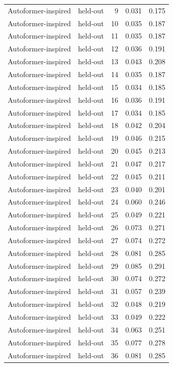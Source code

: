 \begin{tabular}{llrrr}
Autoformer-inspired & held-out & 9 & 0.031 & 0.175 \\
Autoformer-inspired & held-out & 10 & 0.035 & 0.187 \\
Autoformer-inspired & held-out & 11 & 0.035 & 0.187 \\
Autoformer-inspired & held-out & 12 & 0.036 & 0.191 \\
Autoformer-inspired & held-out & 13 & 0.043 & 0.208 \\
Autoformer-inspired & held-out & 14 & 0.035 & 0.187 \\
Autoformer-inspired & held-out & 15 & 0.034 & 0.185 \\
Autoformer-inspired & held-out & 16 & 0.036 & 0.191 \\
Autoformer-inspired & held-out & 17 & 0.034 & 0.185 \\
Autoformer-inspired & held-out & 18 & 0.042 & 0.204 \\
Autoformer-inspired & held-out & 19 & 0.046 & 0.215 \\
Autoformer-inspired & held-out & 20 & 0.045 & 0.213 \\
Autoformer-inspired & held-out & 21 & 0.047 & 0.217 \\
Autoformer-inspired & held-out & 22 & 0.045 & 0.211 \\
Autoformer-inspired & held-out & 23 & 0.040 & 0.201 \\
Autoformer-inspired & held-out & 24 & 0.060 & 0.246 \\
Autoformer-inspired & held-out & 25 & 0.049 & 0.221 \\
Autoformer-inspired & held-out & 26 & 0.073 & 0.271 \\
Autoformer-inspired & held-out & 27 & 0.074 & 0.272 \\
Autoformer-inspired & held-out & 28 & 0.081 & 0.285 \\
Autoformer-inspired & held-out & 29 & 0.085 & 0.291 \\
Autoformer-inspired & held-out & 30 & 0.074 & 0.272 \\
Autoformer-inspired & held-out & 31 & 0.057 & 0.239 \\
Autoformer-inspired & held-out & 32 & 0.048 & 0.219 \\
Autoformer-inspired & held-out & 33 & 0.049 & 0.222 \\
Autoformer-inspired & held-out & 34 & 0.063 & 0.251 \\
Autoformer-inspired & held-out & 35 & 0.077 & 0.278 \\
Autoformer-inspired & held-out & 36 & 0.081 & 0.285 \\

\end{tabular}
